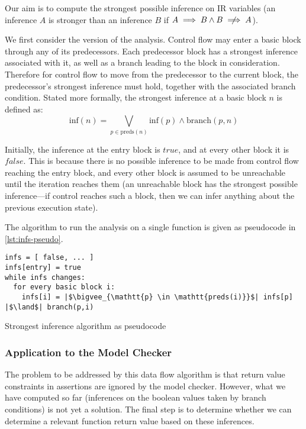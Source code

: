 Our aim is to compute the strongest possible inference on IR variables
(an inference $A$ is stronger than an inference $B$ if $A \implies B
\land B \notimplies A$).

We first consider the  version of the analysis.
Control flow may enter a basic block through any of its predecessors.
Each predecessor block has a strongest inference associated with it, as
well as a branch leading to the block in consideration. Therefore for
control flow to move from the predecessor to the current block, the
predecessor's strongest inference must hold, together with the
associated branch condition. Stated more formally, the strongest
inference at a basic block $n$ is defined as:
\[
  \mathrm{inf}(n) = \bigvee_{p \in \mathrm{preds}(n)}
    \mathrm{inf}(p) \land \mathrm{branch}(p,n)
\]

Initially, the inference at the entry block is $true$, and at every
other block it is $false$. This is because there is no possible
inference to be made from control flow reaching the entry block, and
every other block is assumed to be unreachable until the iteration
reaches them (an unreachable block has the strongest possible
inference---if control reaches such a block, then we can infer anything
about the previous execution state).

The algorithm to run the analysis on a single function is given as
pseudocode in \autoref{lst:infs-pseudo}.

\begin{listing}[ht]
  \begin{verbatim}
infs = [ false, ... ]
infs[entry] = true
while infs changes:
  for every basic block i:
    infs[i] = |$\bigvee_{\mathtt{p} \in \mathtt{preds(i)}}$| infs[p] |$\land$| branch(p,i)
  \end{verbatim}
  \caption{Strongest inference algorithm as pseudocode}
  \label{lst:infs-pseudo}
\end{listing}

\subsubsection{Application to the Model Checker}

The problem to be addressed by this data flow algorithm is that return
value constraints in assertions are ignored by the model checker.
However, what we have computed so far (inferences on the boolean values
taken by branch conditions) is not yet a solution. The final step is to
determine whether we can determine a relevant function return value
based on these inferences.

